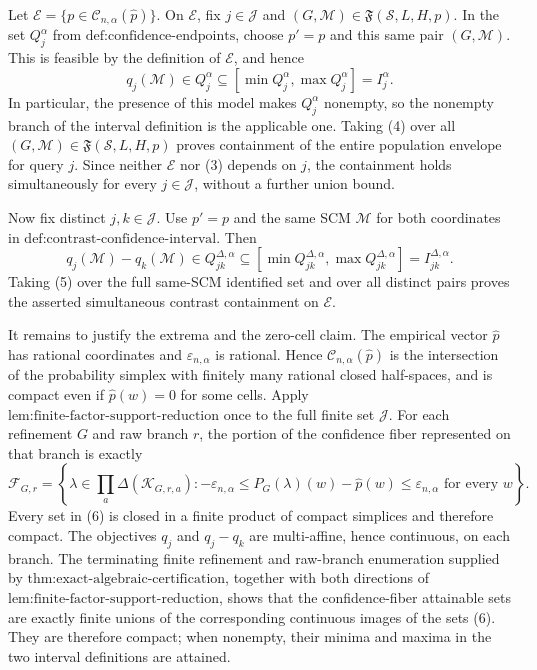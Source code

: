 Let \(\mathcal E=\{p\in\mathcal C_{n,\alpha}(\widehat p)\}\).  On \(\mathcal E\), fix \(j\in\mathcal J\) and \((G,\mathcal M)\in\mathfrak F(\mathcal S,L,H,p)\).  In the set \(Q_j^\alpha\) from \(\text{def:confidence-endpoints}\), choose \(p'=p\) and this same pair \((G,\mathcal M)\).  This is feasible by the definition of \(\mathcal E\), and hence
\[
q_j(\mathcal M)\in Q_j^\alpha\subseteq
[\min Q_j^\alpha,\max Q_j^\alpha]=I_j^\alpha.
\tag{4}
\]
In particular, the presence of this model makes \(Q_j^\alpha\) nonempty, so the nonempty branch of the interval definition is the applicable one.  Taking (4) over all \((G,\mathcal M)\in\mathfrak F(\mathcal S,L,H,p)\) proves containment of the entire population envelope for query \(j\).  Since neither \(\mathcal E\) nor (3) depends on \(j\), the containment holds simultaneously for every \(j\in\mathcal J\), without a further union bound.

Now fix distinct \(j,k\in\mathcal J\).  Use \(p'=p\) and the same SCM \(\mathcal M\) for both coordinates in \(\text{def:contrast-confidence-interval}\).  Then
\[
q_j(\mathcal M)-q_k(\mathcal M)
\in Q_{jk}^{\Delta,\alpha}
\subseteq
[\min Q_{jk}^{\Delta,\alpha},\max Q_{jk}^{\Delta,\alpha}]
=I_{jk}^{\Delta,\alpha}.
\tag{5}
\]
Taking (5) over the full same-SCM identified set and over all distinct pairs proves the asserted simultaneous contrast containment on \(\mathcal E\).

It remains to justify the extrema and the zero-cell claim.  The empirical vector \(\widehat p\) has rational coordinates and \(\varepsilon_{n,\alpha}\) is rational.  Hence \(\mathcal C_{n,\alpha}(\widehat p)\) is the intersection of the probability simplex with finitely many rational closed half-spaces, and is compact even if \(\widehat p(w)=0\) for some cells.  Apply \(\text{lem:finite-factor-support-reduction}\) once to the full finite set \(\mathcal J\).  For each refinement \(G\) and raw branch \(r\), the portion of the confidence fiber represented on that branch is exactly
\[
\mathcal F_{G,r}
=\left\{\lambda\in\prod_a\Delta(\mathcal K_{G,r,a}):
-\varepsilon_{n,\alpha}
\le P_G(\lambda)(w)-\widehat p(w)
\le\varepsilon_{n,\alpha}
\text{ for every }w\right\}.
\tag{6}
\]
Every set in (6) is closed in a finite product of compact simplices and therefore compact.  The objectives \(q_j\) and \(q_j-q_k\) are multi-affine, hence continuous, on each branch.  The terminating finite refinement and raw-branch enumeration supplied by \(\text{thm:exact-algebraic-certification}\), together with both directions of \(\text{lem:finite-factor-support-reduction}\), shows that the confidence-fiber attainable sets are exactly finite unions of the corresponding continuous images of the sets (6).  They are therefore compact; when nonempty, their minima and maxima in the two interval definitions are attained.

